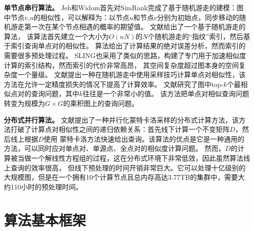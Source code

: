 \documentclass[master]{njuthesis}
\begin{document}
\textbf{单节点串行算法。 }Jeh和Widom\cite{jeh2002simrank}首先对SimRank完成了基于随机游走的建模：图中节点$v$,$u$的相似性，可以解释为：以节点$u$和节点$v$分别为初始点，同步移动的随机游走第一次在某个节点相遇的概率的期望值。
文献\cite{fogaras2005scaling}给出了一个基于随机游走的算法， 该算法首先建立一个大小为$O(nN)$的$N$个随机游走的“指纹”索引，然后基于索引查询单点对的相似性。
算法给出了计算结果的绝对误差分析，然而索引的需要很多预处理过程。
SLING\cite{DBLP:conf/sigmod/TianX16}也采用了类似的思路，构建了专门用于加速相似度计算的索引结构，然而索引的代价非常高昂，
其空间复杂度超过图本身的空间复杂度一个量级。
文献\cite{kusumoto2014scalable}提出一种在随机游走中使用采样技巧计算单点对相似性，该方法在允许一定精度损失的情况下提高了计算效率。
文献\cite{lee2012top}研究了图中top-$k$个最相似点对的查询问题，其中$k$往往是一个非常小的值。
该方法把单点对相似查询问题转变为规模为$G\times G$的乘积图上的查询问题。

\textbf{分布式并行算法。 }
文献\cite{DBLP:journals/pvldb/LiFLCCL15}提出了一种并行化蒙特卡洛采样的分布式计算方法，该方法打破了计算点对相似性之间的递归依赖关系：首先线下计算一个不变矩阵$D$，然后线上根据$D$使用
蒙特卡洛方法快速给出查询。该算法的优点是它是一种通用的方法，可以同时应对单点对、单源点、全点对的相似度计算问题。
然而，$D$的计算被当做一个解线性方程组的过程，这在分布式环境下非常低效，因此虽然算法线上查询的效率很高，
但线下预处理的时间开销非常巨大。它可以处理十亿级别的大规模图，但是在一个拥有10个计算节点且总内存高达3.77TB的集群中，需要大约110小时的预处理时间。

\section{算法基本框架}
\end{document}
